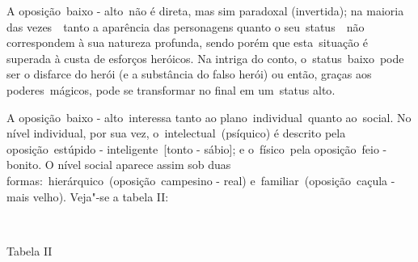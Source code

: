 A oposição~{baixo - alto}~não é direta, mas sim paradoxal (invertida);
na maioria das vezes~~tanto a aparência das personagens quanto o
seu~{status}~~não correspondem à sua natureza profunda, sendo porém que
esta~situação é superada à custa de esforços heróicos. Na intriga do
conto, o~{status}~{baixo}~pode ser o disfarce do herói (e a substância
do falso herói) ou então, graças aos poderes~{mágicos}, pode se
transformar no final em um~{status alto}.

A oposição~{baixo - alto}~interessa tanto ao plano~{individual}~quanto
ao~{social}. No nível individual, por sua vez,
o~{intelectual}~(psíquico) é descrito pela oposição~{estúpido -
inteligente}~{[}tonto - sábio{]}; e o~{físico}~pela oposição~{feio -
bonito}. O nível social aparece assim sob duas
formas:~{hierárquico}~(oposição~{campesino - real})
e~{familiar}~(oposição~{caçula - mais velho}). Veja"-se a tabela II:

~

Tabela II



~

~

